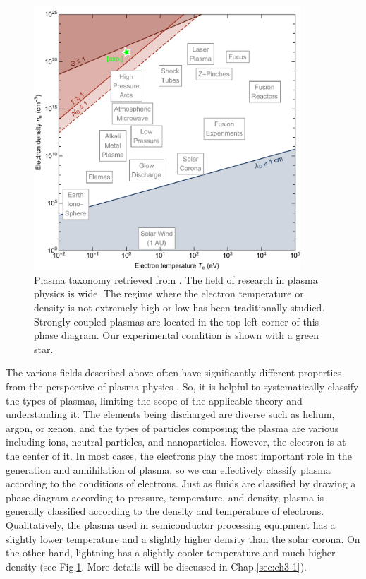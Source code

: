 \begin{figure}[ht!]
\centering
\includegraphics[width=100mm]{figures/ch1/taxonomy/taxonomy.pdf}
\caption{Plasma taxonomy retrieved from \cite{huba1998nrl}. The field of research in plasma physics is wide. The regime where the electron temperature or density is not extremely high or low has been traditionally studied. Strongly coupled plasmas are located in the top left corner of this phase diagram. Our experimental condition is shown with a green star.}
\label{fig:taxonomy}
\end{figure}

The various fields described above often have significantly different properties from the perspective of plasma physics \cite{huba1998nrl, bellan2008fundamentals}. So, it is helpful to systematically classify the types of plasmas, limiting the scope of the applicable theory and understanding it. The elements being discharged are diverse such as helium, argon, or xenon, and the types of particles composing the plasma are various including ions, neutral particles, and nanoparticles. However, the electron is at the center of it. In most cases, the electrons play the most important role in the generation and annihilation of plasma, so we can effectively classify plasma according to the conditions of electrons. Just as fluids are classified by drawing a phase diagram according to pressure, temperature, and density, plasma is generally classified according to the density and temperature of electrons. Qualitatively, the plasma used in semiconductor processing equipment has a slightly lower temperature and a slightly higher density than the solar corona. On the other hand, lightning has a slightly cooler temperature and much higher density (see Fig.\ref{fig:taxonomy}. More details will be discussed in Chap.\ref{sec:ch3-1}).

